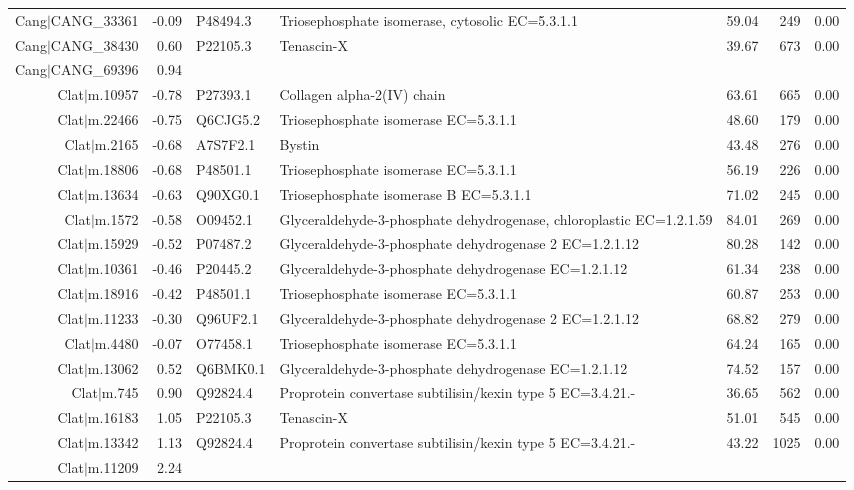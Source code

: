 \begin{table}[hp]
\begin{tabular}{rrllrrr}
  Cang$|$CANG\_33361 & -0.09 & P48494.3 & Triosephosphate isomerase, cytosolic EC=5.3.1.1 & 59.04 & 249 & 0.00 \\ 
  Cang$|$CANG\_38430 & 0.60 & P22105.3 & Tenascin-X & 39.67 & 673 & 0.00 \\ 
  Cang$|$CANG\_69396 & 0.94 &  &  &  &  &  \\ 
  Clat$|$m.10957 & -0.78 & P27393.1 & Collagen alpha-2(IV) chain & 63.61 & 665 & 0.00 \\ 
  Clat$|$m.22466 & -0.75 & Q6CJG5.2 & Triosephosphate isomerase EC=5.3.1.1 & 48.60 & 179 & 0.00 \\ 
  Clat$|$m.2165 & -0.68 & A7S7F2.1 & Bystin & 43.48 & 276 & 0.00 \\ 
  Clat$|$m.18806 & -0.68 & P48501.1 & Triosephosphate isomerase EC=5.3.1.1 & 56.19 & 226 & 0.00 \\ 
  Clat$|$m.13634 & -0.63 & Q90XG0.1 & Triosephosphate isomerase B EC=5.3.1.1 & 71.02 & 245 & 0.00 \\ 
  Clat$|$m.1572 & -0.58 & O09452.1 & Glyceraldehyde-3-phosphate dehydrogenase, chloroplastic EC=1.2.1.59 & 84.01 & 269 & 0.00 \\ 
  Clat$|$m.15929 & -0.52 & P07487.2 & Glyceraldehyde-3-phosphate dehydrogenase 2 EC=1.2.1.12 & 80.28 & 142 & 0.00 \\ 
  Clat$|$m.10361 & -0.46 & P20445.2 & Glyceraldehyde-3-phosphate dehydrogenase EC=1.2.1.12 & 61.34 & 238 & 0.00 \\ 
  Clat$|$m.18916 & -0.42 & P48501.1 & Triosephosphate isomerase EC=5.3.1.1 & 60.87 & 253 & 0.00 \\ 
  Clat$|$m.11233 & -0.30 & Q96UF2.1 & Glyceraldehyde-3-phosphate dehydrogenase 2 EC=1.2.1.12 & 68.82 & 279 & 0.00 \\ 
  Clat$|$m.4480 & -0.07 & O77458.1 & Triosephosphate isomerase EC=5.3.1.1 & 64.24 & 165 & 0.00 \\ 
  Clat$|$m.13062 & 0.52 & Q6BMK0.1 & Glyceraldehyde-3-phosphate dehydrogenase EC=1.2.1.12 & 74.52 & 157 & 0.00 \\ 
  Clat$|$m.745 & 0.90 & Q92824.4 & Proprotein convertase subtilisin/kexin type 5 EC=3.4.21.- & 36.65 & 562 & 0.00 \\ 
  Clat$|$m.16183 & 1.05 & P22105.3 & Tenascin-X & 51.01 & 545 & 0.00 \\ 
  Clat$|$m.13342 & 1.13 & Q92824.4 & Proprotein convertase subtilisin/kexin type 5 EC=3.4.21.- & 43.22 & 1025 & 0.00 \\ 
  Clat$|$m.11209 & 2.24 &  &  &  &  &  \\ 

\end{tabular}
\end{table}
